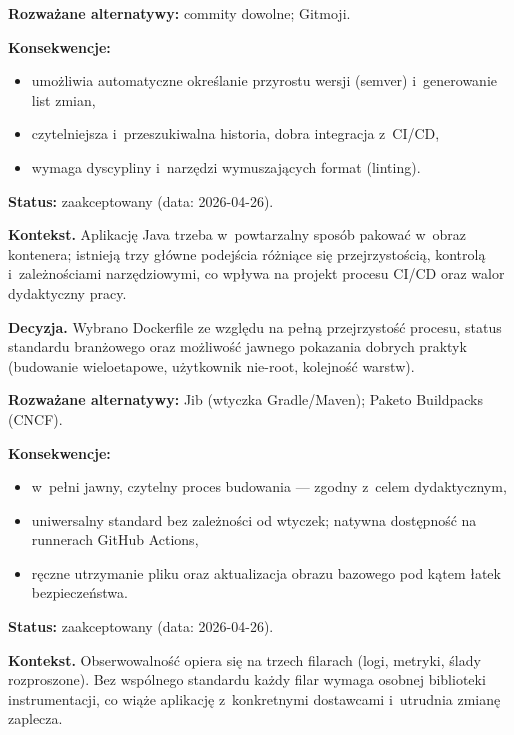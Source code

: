 \textbf{Rozważane alternatywy:} commity dowolne; Gitmoji.

\textbf{Konsekwencje:}
\begin{itemize}
  \item[$+$] umożliwia automatyczne określanie przyrostu wersji (semver) i~generowanie list zmian,
  \item[$+$] czytelniejsza i~przeszukiwalna historia, dobra integracja z~CI/CD,
  \item[$-$] wymaga dyscypliny i~narzędzi wymuszających format (linting).
\end{itemize}


\textbf{Status:} zaakceptowany (data: 2026-04-26).

\textbf{Kontekst.} Aplikację Java trzeba w~powtarzalny sposób pakować w~obraz kontenera; istnieją trzy główne podejścia różniące się przejrzystością, kontrolą i~zależnościami narzędziowymi, co wpływa na projekt procesu CI/CD oraz walor dydaktyczny pracy.

\textbf{Decyzja.} Wybrano Dockerfile ze względu na pełną przejrzystość procesu, status standardu branżowego oraz możliwość jawnego pokazania dobrych praktyk (budowanie wieloetapowe, użytkownik nie-root, kolejność warstw).

\textbf{Rozważane alternatywy:} Jib (wtyczka Gradle/Maven); Paketo Buildpacks (CNCF).

\textbf{Konsekwencje:}
\begin{itemize}
  \item[$+$] w~pełni jawny, czytelny proces budowania --- zgodny z~celem dydaktycznym,
  \item[$+$] uniwersalny standard bez zależności od wtyczek; natywna dostępność na runnerach GitHub Actions,
  \item[$-$] ręczne utrzymanie pliku oraz aktualizacja obrazu bazowego pod kątem łatek bezpieczeństwa.
\end{itemize}


\textbf{Status:} zaakceptowany (data: 2026-04-26).

\textbf{Kontekst.} Obserwowalność opiera się na trzech filarach (logi, metryki, ślady rozproszone). Bez wspólnego standardu każdy filar wymaga osobnej biblioteki instrumentacji, co wiąże aplikację z~konkretnymi dostawcami i~utrudnia zmianę zaplecza.

